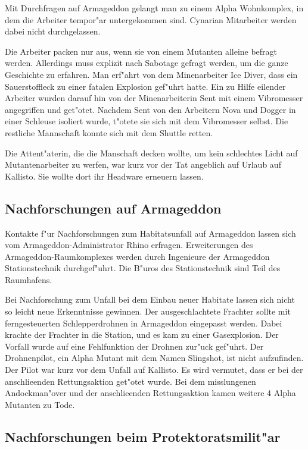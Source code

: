 Mit Durchfragen auf Armageddon gelangt man zu einem Alpha Wohnkomplex, in dem die Arbeiter tempor"ar untergekommen sind. Cynarian Mitarbeiter werden dabei nicht durchgelassen.

Die Arbeiter packen nur aus, wenn sie von einem Mutanten alleine befragt werden. Allerdings muss explizit nach Sabotage gefragt werden, um die ganze Geschichte zu erfahren. Man erf"ahrt von dem Minenarbeiter Ice Diver, dass ein Sauerstoffleck  zu einer fatalen Explosion gef"uhrt hatte. Ein zu Hilfe eilender Arbeiter wurden darauf hin von der Minenarbeiterin Sent mit einem Vibromesser angegriffen und get"otet. Nachdem Sent von den Arbeitern Nova und Dogger in einer Schleuse isoliert wurde, t"otete sie sich mit dem Vibromesser selbst. Die restliche Mannschaft konnte sich mit dem Shuttle retten.

Die Attent"aterin, die die Manschaft decken wollte, um kein schlechtes Licht auf Mutantenarbeiter zu werfen, war kurz vor der Tat angeblich auf Urlaub auf Kallisto. Sie wollte dort ihr Headware erneuern lassen.

\subsection{Nachforschungen auf Armageddon}

Kontakte f"ur Nachforschungen zum Habitatsunfall auf Armageddon lassen sich vom Armageddon-Administrator Rhino erfragen. Erweiterungen des Armageddon-Raumkomplexes werden durch Ingenieure der Armageddon Stationstechnik durchgef"uhrt. Die B"uros des Stationstechnik sind Teil des Raumhafens.

Bei Nachforschung zum Unfall bei dem Einbau neuer Habitate lassen sich nicht so leicht neue Erkenntnisse gewinnen. Der
ausgeschlachtete Frachter sollte  mit ferngesteuerten Schlepperdrohnen in Armageddon eingepasst werden. Dabei krachte
der Frachter in die Station, und es kam zu einer Gasexplosion. Der Vorfall wurde auf eine Fehlfunktion der Drohnen
zur"uck gef"uhrt. Der Drohnenpilot, ein Alpha Mutant mit dem Namen Slingshot, ist nicht aufzufinden. Der Pilot
war kurz vor dem Unfall auf Kallisto. Es wird  vermutet, dass er bei der anschlie\3enden Rettungsaktion get"otet wurde.
Bei dem misslungenen Andockman"over und der anschlie\3enden Rettungsaktion kamen weitere 4 Alpha Mutanten zu Tode.

\subsection{Nachforschungen beim Protektoratsmilit"ar}

